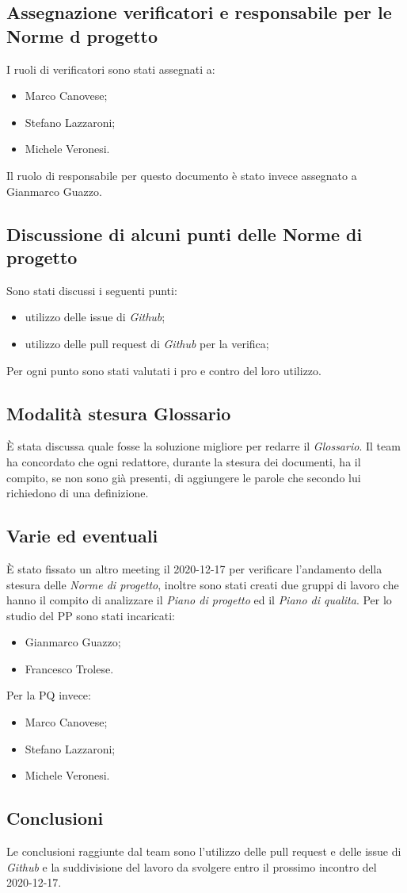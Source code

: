 	\subsection{Assegnazione verificatori e responsabile per le Norme d progetto}
	I ruoli di verificatori sono stati assegnati a:
	\begin{itemize}
		\item Marco Canovese;
		\item Stefano Lazzaroni;
		\item Michele Veronesi.
	\end{itemize}
	Il ruolo di responsabile per questo documento è stato invece assegnato a Gianmarco Guazzo.

	\subsection{Discussione di alcuni punti delle Norme di progetto}
	Sono stati discussi i seguenti punti:
	\begin{itemize}
		\item utilizzo delle issue di \textit{Github};
		\item utilizzo delle pull request di \textit{Github} per la verifica;
	\end{itemize}
	Per ogni punto sono stati valutati i pro e contro del loro utilizzo.

	\subsection{Modalità stesura Glossario}
	È stata discussa quale fosse la soluzione migliore per redarre il \textit{Glossario}. Il team ha concordato che ogni redattore, durante la stesura dei documenti, ha il compito, se non sono già presenti, di aggiungere le parole che secondo lui richiedono di una definizione.
	
	\subsection{Varie ed eventuali}
	È stato fissato un altro meeting il 2020-12-17 per verificare l'andamento della stesura delle \textit{Norme di progetto}, inoltre sono stati creati due gruppi di lavoro che hanno il compito di analizzare il \textit{Piano di progetto} ed il \textit{Piano di qualita}.
	Per lo studio del PP sono stati incaricati:
	\begin{itemize}
		\item Gianmarco Guazzo;
		\item Francesco Trolese.
	\end{itemize}
	Per la PQ invece:
	\begin{itemize}
		\item Marco Canovese;
		\item Stefano Lazzaroni;
		\item Michele Veronesi.
	\end{itemize}
	

	\subsection{Conclusioni}
	Le conclusioni raggiunte dal team sono l'utilizzo delle pull request e delle issue di \textit{Github} e la suddivisione del lavoro da svolgere entro il prossimo incontro del 2020-12-17.

	